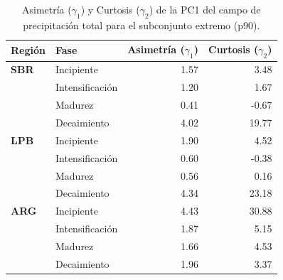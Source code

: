 \begin{table}[htbp]
\centering
\caption[Momentos estadísticos de la PC1 de precipitación - Subconjunto p90]{Asimetría ($\gamma_1$) y Curtosis ($\gamma_2$) de la PC1 del campo de precipitación total para el subconjunto extremo (p90).}
\label{tab:momentos_p90_tp}
\begin{tabular*}{\textwidth}{@{\extracolsep{\fill}}llrr}
\hline
\textbf{Región} & \textbf{Fase} & \textbf{Asimetría ($\gamma_1$)} & \textbf{Curtosis ($\gamma_2$)} \\
\hline
\textbf{SBR} & Incipiente & 1.57 & 3.48 \\
 & Intensificación & 1.20 & 1.67 \\
 & Madurez & 0.41 & -0.67 \\
 & Decaimiento & 4.02 & 19.77 \\
\hline
\textbf{LPB} & Incipiente & 1.90 & 4.52 \\
 & Intensificación & 0.60 & -0.38 \\
 & Madurez & 0.56 & 0.16 \\
 & Decaimiento & 4.34 & 23.18 \\
\hline
\textbf{ARG} & Incipiente & 4.43 & 30.88 \\
 & Intensificación & 1.87 & 5.15 \\
 & Madurez & 1.66 & 4.53 \\
 & Decaimiento & 1.96 & 3.37 \\
\hline
\end{tabular*}
\end{table}